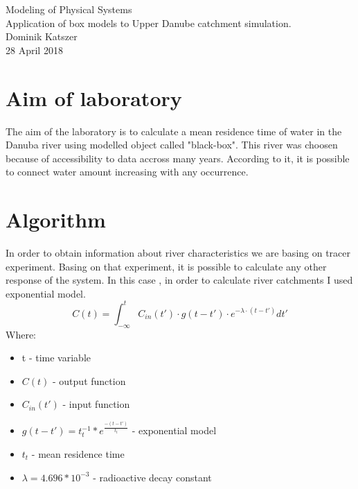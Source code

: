 \documentclass[a4paper,12pt]{article}
\begin{document}
\begin{titlepage}
\center
\vspace*{\fill}
\Huge{Modeling of Physical Systems}\\
\Large{Application of box models to Upper
Danube catchment simulation.}\\
\vspace*{1.5cm}
Dominik Katszer\\
\large{28 April 2018}
\vspace*{1.5cm}
\vspace*{\fill}
\end{titlepage}
\section{Aim of laboratory}
The aim of the laboratory is to calculate a mean residence time of water in the  Danuba river using modelled object called "black-box". This river was choosen because of accessibility to data accross many years. According to it, it is possible to connect water amount
increasing with any occurrence.
\section{Algorithm}
In order to obtain information about river characteristics we are basing on tracer experiment. Basing on that experiment, it is possible to calculate any other response of the system. In this case , in order to calculate  river catchments I used exponential model.
\begin{equation}
	C(t) = \int_{- \infty}^{t} C_{in}(t') \cdot g(t - t') \cdot e^{-\lambda \cdot (t - t')} dt'
\end{equation}
Where:
\begin{itemize}
    \item t - time variable
	\item $C(t)$ - output function
    \item $C_{in}(t')$ - input function
    \item $g(t - t') = t_t^{-1}*e^{\frac{-(t-t')}{t_t}}$ - exponential model
    \item $t_t$ - mean residence time
    \item $\lambda = 4.696 * 10^{-3}$ - radioactive decay constant
\end{itemize}
\end{document}
